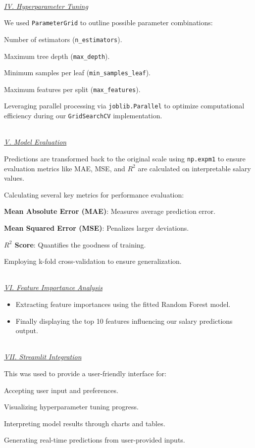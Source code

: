 \documentclass[11pt,a4paper]{article}
\newcommand{\SubItem}[1]{
  {\setlength\itemindent{13pt} \item[◦] #1}
}
\newcommand{\subsubsubsection}[1]{
  {\setlength\itemindent{13pt} \textit{\uline{\\#1\\}}} 
}
\begin{document}
\subsubsubsection{IV. Hyperparameter Tuning}
\begin{itemize}
\item We used \texttt{ParameterGrid} to outline possible parameter combinations:
\SubItem{Number of estimators (\texttt{n\_estimators}).}
\SubItem{Maximum tree depth (\texttt{max\_depth}).}
\SubItem{Minimum samples per leaf (\texttt{min\_samples\_leaf}).}
\SubItem{Maximum features per split (\texttt{max\_features}).}
\item Leveraging parallel processing via \texttt{joblib.Parallel} to optimize computational efficiency during our \texttt{GridSearchCV} implementation.
\end{itemize}

\subsubsubsection{V. Model Evaluation}
\begin{itemize}
\item Predictions are transformed back to the original scale using \texttt{np.expm1} to ensure evaluation metrics like MAE, MSE, and $R^2$ are calculated on interpretable salary values.
\item Calculating several key metrics for performance evaluation:
\SubItem{\textbf{Mean Absolute Error (MAE)}: Measures average prediction error.}
\SubItem{\textbf{Mean Squared Error (MSE)}: Penalizes larger deviations.}
\SubItem{\textbf{ $R^2$ Score}: Quantifies the goodness of training.}
\item Employing k-fold cross-validation to ensure generalization.
\end{itemize}

\subsubsubsection{VI. Feature Importance Analysis}
\begin{itemize}
\item Extracting feature importances using the fitted Random Forest model.
\item Finally displaying the top 10 features influencing our salary predictions output. 
\end{itemize}

\subsubsubsection{VII. Streamlit Integration}
\begin{itemize}
\item This was used to provide a user-friendly interface for:
\SubItem{Accepting user input and preferences.}
\SubItem{Visualizing hyperparameter tuning progress.}
\SubItem{Interpreting model results through charts and tables.}
\SubItem{Generating real-time predictions from user-provided inputs.}
\end{itemize}
\end{document}
